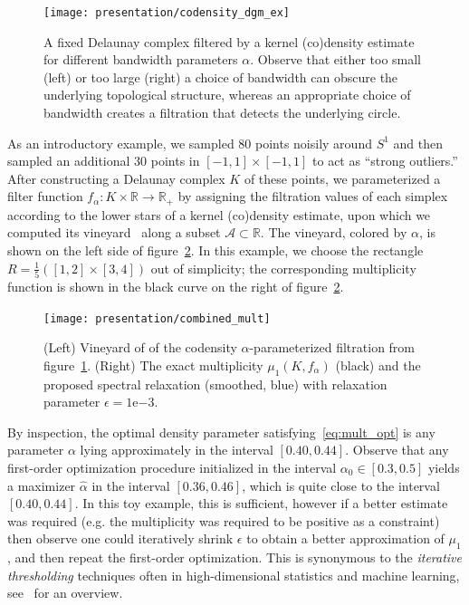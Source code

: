 \documentclass[10pt]{article}
\numberwithin{equation}{section}
\newcommand{\+}{%
	\raisebox{0.18ex}{\scaleobj{0.55}{+}}
}
\theoremstyle{definition}
\theoremstyle{definition}
\begin{document}
\begin{figure}[ht]
	\centering
	\texttt{[image: presentation/codensity\_dgm\_ex]}
	\caption{A fixed Delaunay complex filtered by a kernel (co)density estimate for different bandwidth parameters $\alpha$. Observe that either too small (left) or too large (right) a choice of bandwidth can obscure the underlying topological structure, whereas an appropriate choice of bandwidth creates a filtration that detects the underlying circle. 
	}\label{fig:codensity}
\end{figure}

As an introductory example, we sampled $80$ points noisily around $S^1$ and then sampled an additional $30$ points in $[-1,1] \times [-1,1]$ to act as ``strong outliers.'' After constructing a Delaunay complex $K$ of these points, we parameterized a filter function $f_\alpha : K \times \mathbb{R} \to \mathbb{R}_+$ by assigning the filtration values of each simplex according to the lower stars of a kernel (co)density estimate, upon which we computed its vineyard~\cite{cohen2006vines} along a subset $\mathcal{A} \subset \mathbb{R}$. The vineyard, colored by $\alpha$, is shown on the left side of figure~\ref{fig:vineyard_codensity}. In this example, we choose the rectangle $R = \frac{1}{5}([1, 2] \times [3,4])$ out of simplicity; the corresponding multiplicity function is shown in the black curve on the right of figure~\ref{fig:vineyard_codensity}. 
\begin{figure}[h]
	\centering
	\texttt{[image: presentation/combined\_mult]}
	\caption{(Left) Vineyard of of the codensity $\alpha$-parameterized filtration from figure~\ref{fig:codensity}. (Right) The exact multiplicity $\mu_1(K, f_\alpha)$ (black) and the proposed spectral relaxation (smoothed, blue) with relaxation parameter $\epsilon = 1\mathrm{e}{-3}$.}\label{fig:vineyard_codensity}
\end{figure}
By inspection, the optimal density parameter satisfying~\eqref{eq:mult_opt} is any parameter $\alpha$ lying approximately in the interval $[0.40, 0.44]$. 
Observe that any first-order optimization procedure initialized in the interval $\alpha_0 \in [0.3, 0.5]$ yields a maximizer $\hat{\alpha}$ in the interval $[0.36, 0.46]$, which is quite close to the interval $[0.40, 0.44]$. In this toy example, this is sufficient, however if a better estimate was required (e.g. the multiplicity was required to be positive as a constraint) then observe one could iteratively shrink $\epsilon$ to obtain a better approximation of $\mu_1$, and then repeat the first-order optimization. 
This is synonymous to the \emph{iterative thresholding} techniques often in high-dimensional statistics and machine learning, see~\cite{} for an overview.
\end{document}
